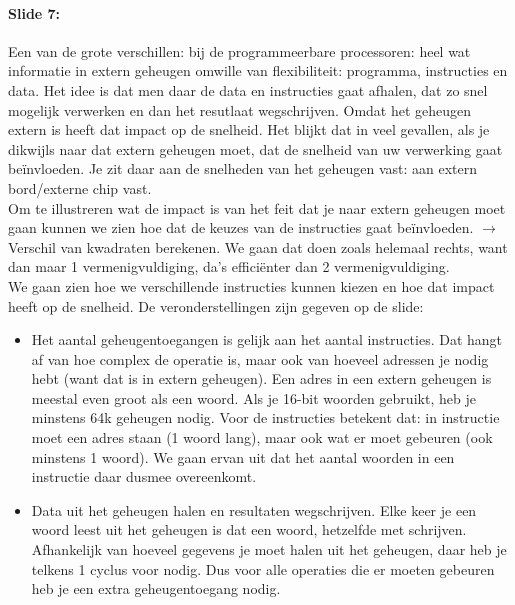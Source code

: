 \documentclass[10pt,a4paper]{book}
\begin{document}
\paragraph{Slide 7:} Een van de grote verschillen: bij de programmeerbare processoren: heel wat informatie in extern geheugen omwille van flexibiliteit: programma, instructies en data. Het idee is dat men daar de data en instructies gaat afhalen, dat zo snel mogelijk verwerken en dan het resutlaat wegschrijven. Omdat het geheugen extern is heeft dat impact op de snelheid. Het blijkt dat in veel gevallen, als je dikwijls naar dat extern geheugen moet, dat de snelheid van uw verwerking gaat be\"invloeden. Je zit daar aan de snelheden van het geheugen vast: aan extern bord/externe chip vast.\\
Om te illustreren wat de impact is van het feit dat je naar extern geheugen moet gaan kunnen we zien hoe dat de keuzes van de instructies gaat be\"invloeden. $\rightarrow$ Verschil van kwadraten berekenen. We gaan dat doen zoals helemaal rechts, want dan maar 1 vermenigvuldiging, da's effici\"enter dan 2 vermenigvuldiging.\\
We gaan zien hoe we verschillende instructies kunnen kiezen en hoe dat impact heeft op de snelheid. De veronderstellingen zijn gegeven op de slide:
\begin{itemize}
\item Het aantal geheugentoegangen is gelijk aan het aantal instructies. Dat hangt af van hoe complex de operatie is, maar ook van hoeveel adressen je nodig hebt (want dat is in extern geheugen). Een adres in een extern geheugen is meestal even groot als een woord. Als je 16-bit woorden gebruikt, heb je minstens 64k geheugen nodig. Voor de instructies betekent dat: in instructie moet een adres staan (1 woord lang), maar ook wat er moet gebeuren (ook minstens 1 woord). We gaan ervan uit dat het aantal woorden in een instructie daar dusmee overeenkomt. 
\item Data uit het geheugen halen en resultaten wegschrijven. Elke keer je een woord leest uit het geheugen is dat een woord, hetzelfde met schrijven. Afhankelijk van hoeveel gegevens je moet halen uit het geheugen, daar heb je telkens 1 cyclus voor nodig. Dus voor alle operaties die er moeten gebeuren heb je een extra geheugentoegang nodig.
\end{itemize}
\end{document}
